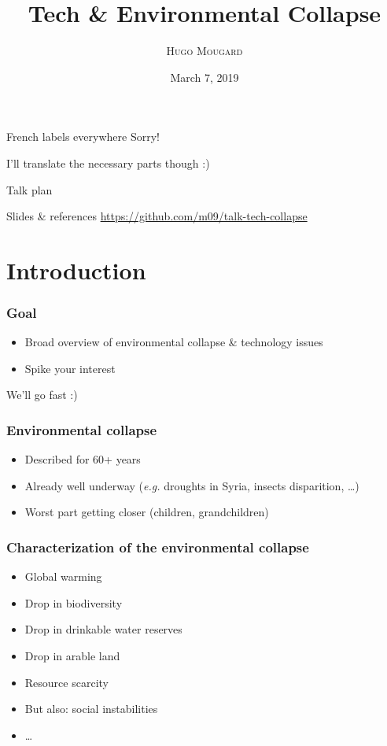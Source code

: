 \documentclass[10pt]{beamer}
\title{Tech \& Environmental Collapse}
\subtitle{}
\date{March 7, 2019}
\author{\textsc{Hugo Mougard}}
\begin{document}
\newcommand{\CO}{$\text{CO}_{\text{2}}$}

\maketitle

\begin{frame}{French labels everywhere}
  Sorry!

  I'll translate the necessary parts though :)
\end{frame}

\begin{frame}{Talk plan}
  \tableofcontents
\end{frame}

\begin{frame}{Slides \& references}
  \url{https://github.com/m09/talk-tech-collapse}
\end{frame}

\section{Introduction}
\label{sec:introduction}

\begin{frame}
  \frametitle{Goal}

  \begin{itemize}
  \item Broad overview of environmental collapse \& technology issues
  \item Spike your interest
  \end{itemize}

  We'll go fast :)
\end{frame}

\begin{frame}
  \frametitle{Environmental collapse}

  \begin{itemize}[<+->]
  \item Described for 60+ years
  \item Already well underway (\textit{e.g.} droughts in Syria,
    insects disparition, …)
  \item Worst part getting closer (children, grandchildren)
  \end{itemize}
\end{frame}

\begin{frame}
  \frametitle{Characterization of the environmental collapse}

  \begin{itemize}[<+->]
  \item Global warming
  \item Drop in biodiversity
  \item Drop in drinkable water reserves
  \item Drop in arable land
  \item Resource scarcity
  \item But also: social instabilities
  \item …
  \end{itemize}
\end{frame}
\end{document}
